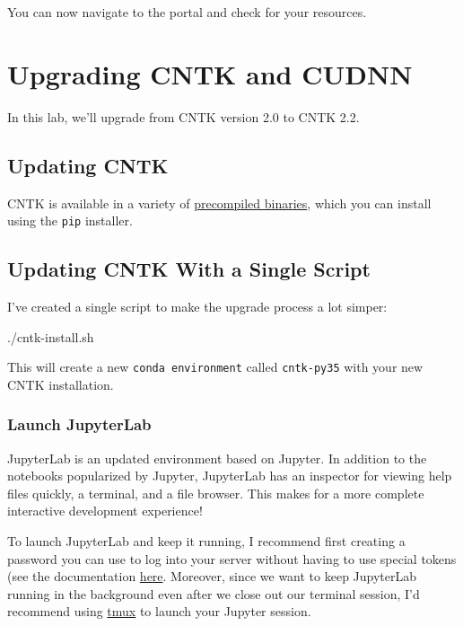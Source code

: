 \documentclass[]{book}
\newenvironment{Shaded}{\begin{snugshade}}{\end{snugshade}}
\newcommand{\ExtensionTok}[1]{#1}
\theoremstyle{definition}
\theoremstyle{definition}
\theoremstyle{definition}
\theoremstyle{remark}
\begin{document}
You can now navigate to the portal and check for your resources.

\chapter{Upgrading CNTK and CUDNN}\label{upgrading-cntk-and-cudnn}

In this lab, we'll upgrade from CNTK version 2.0 to CNTK 2.2.

\section{Updating CNTK}\label{updating-cntk}

CNTK is available in a variety of
\href{https://docs.microsoft.com/en-us/cognitive-toolkit/setup-cntk-on-your-machine}{precompiled
binaries}, which you can install using the \texttt{pip} installer.

\section{Updating CNTK With a Single
Script}\label{updating-cntk-with-a-single-script}

I've created a single script to make the upgrade process a lot simper:

\begin{Shaded}
\begin{Highlighting}[]
\ExtensionTok{./cntk-install.sh}
\end{Highlighting}
\end{Shaded}

This will create a new \texttt{conda\ environment} called
\texttt{cntk-py35} with your new CNTK installation.

\subsection{Launch JupyterLab}\label{launch-jupyterlab}

JupyterLab is an updated environment based on Jupyter. In addition to
the notebooks popularized by Jupyter, JupyterLab has an inspector for
viewing help files quickly, a terminal, and a file browser. This makes
for a more complete interactive development experience!

To launch JupyterLab and keep it running, I recommend first creating a
password you can use to log into your server without having to use
special tokens (see the documentation
\href{http://nbconvert.readthedocs.io/en/latest/usage.html}{here}.
Moreover, since we want to keep JupyterLab running in the background
even after we close out our terminal session, I'd recommend using
\href{https://github.com/tmux/tmux/wiki}{tmux} to launch your Jupyter
session.
\end{document}
